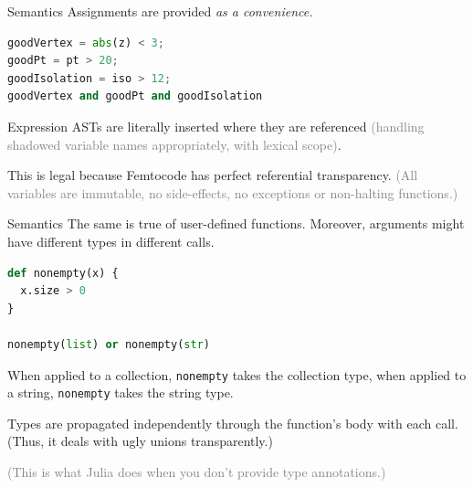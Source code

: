 \documentclass{beamer}
\begin{document}
\begin{frame}[fragile]{Semantics}
\vspace{0.5 cm}
Assignments are provided {\it as a convenience.}

\begin{center}
\begin{minipage}{0.9\linewidth}
\small
\begin{lstlisting}[language=python]
goodVertex = abs(z) < 3;
goodPt = pt > 20;
goodIsolation = iso > 12;
goodVertex and goodPt and goodIsolation
\end{lstlisting}
\end{minipage}
\end{center}

Expression ASTs are literally inserted where they are referenced \textcolor{gray}{(handling shadowed variable names appropriately, with lexical scope)}.

\vspace{0.5 cm}
This is legal because Femtocode has perfect referential transparency. \textcolor{gray}{(All variables are immutable, no side-effects, no exceptions or non-halting functions.)}
\end{frame}

\begin{frame}[fragile]{Semantics}
\vspace{0.5 cm}
The same is true of user-defined functions. Moreover, arguments might have different types in different calls.

\begin{center}
\begin{minipage}{0.9\linewidth}
\small
\begin{lstlisting}[language=python]
def nonempty(x) {
  x.size > 0
}

nonempty(list) or nonempty(str)
\end{lstlisting}
\end{minipage}
\end{center}

When applied to a collection, {\small\tt nonempty} takes the collection type, when applied to a string, {\small\tt nonempty} takes the string type.

\vspace{0.5 cm}
Types are propagated independently through the function's body with each call. (Thus, it deals with ugly unions transparently.)

\vspace{0.5 cm}
\textcolor{gray}{(This is what Julia does when you don't provide type annotations.)}
\end{frame}
\end{document}

